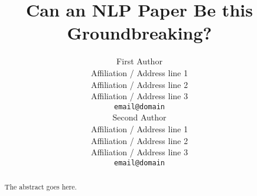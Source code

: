 \documentclass[11pt]{article}
\title{Can an NLP Paper Be this Groundbreaking?}
\author{First Author \\
  Affiliation / Address line 1 \\
  Affiliation / Address line 2 \\
  Affiliation / Address line 3 \\
  \texttt{email@domain} \\\And
  Second Author \\
  Affiliation / Address line 1 \\
  Affiliation / Address line 2 \\
  Affiliation / Address line 3 \\
  \texttt{email@domain} \\}
\begin{document}
\maketitle
\begin{abstract}

  The abstract goes here.

\end{abstract}










\end{document}

